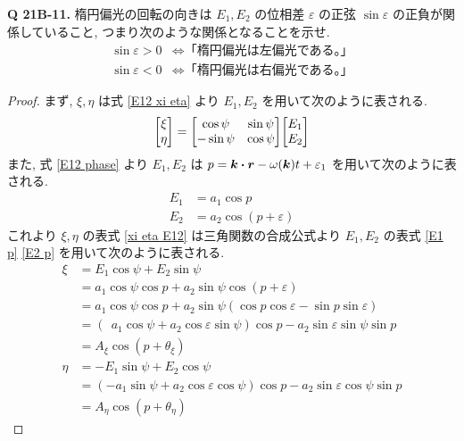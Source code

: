 \documentclass[uplatex,a4paper,dvipdfmx]{jsarticle}
\theoremstyle{definition}
\begin{document}
\textbf{Q 21B-11.}
楕円偏光の回転の向きは $E_1, E_2$ の位相差 $\varepsilon$ の正弦 $\sin\varepsilon$ の正負が関係していること, つまり次のような関係となることを示せ.
\begin{align}
  \sin\varepsilon > 0 & \iff \textrm{「楕円偏光は左偏光である。」} \\
  \sin\varepsilon < 0 & \iff \textrm{「楕円偏光は右偏光である。」}
\end{align}
\begin{proof}
  まず, $\xi,\eta$ は式 \eqref{E12 xi eta} より $E_1, E_2$ を用いて次のように表される.
  \begin{align}
    \mqty[\xi \\ \eta] = \mqty[\cos\psi & \sin\psi \\ -\sin\psi & \cos\psi]\mqty[E_1 \\ E_2] \label{xi eta E12}
  \end{align}
  また, 式 \eqref{E12 phase} より $E_1, E_2$ は $p = \kk\vdot\rr - \omega(\kk)t + \varepsilon_1$ を用いて次のように表される.
  \begin{align}
    E_1 & = a_1\cos{p}            \label{E1 p}    \\
    E_2 & = a_2\cos(p + \varepsilon) \label{E2 p}
  \end{align}
  これより $\xi, \eta$ の表式 \eqref{xi eta E12} は三角関数の合成公式より $E_1, E_2$ の表式 \eqref{E1 p} \eqref{E2 p} を用いて次のように表される.
  \begin{align}
    \xi  & = E_1\cos\psi + E_2\sin\psi                                                                  \\
         & = a_1\cos\psi\cos{p} + a_2\sin\psi\cos(p + \varepsilon)                                      \\
         & = a_1\cos\psi\cos{p} + a_2\sin\psi(\cos{p}\cos\varepsilon - \sin{p}\sin\varepsilon)          \\
         & = (\ \  a_1\cos\psi + a_2\cos\varepsilon\sin\psi)\cos{p} - a_2\sin\varepsilon\sin\psi\sin{p} \\
         & = A_\xi\cos(p + \theta_\xi) \label{xi}                                                       \\
    \eta & = -E_1\sin\psi + E_2\cos\psi                                                                 \\
         & = (-a_1\sin\psi + a_2\cos\varepsilon\cos\psi)\cos{p} - a_2\sin\varepsilon\cos\psi\sin{p}     \\
         & = A_\eta\cos(p + \theta_\eta) \label{eta}
  \end{align}

\end{proof}
\end{document}
